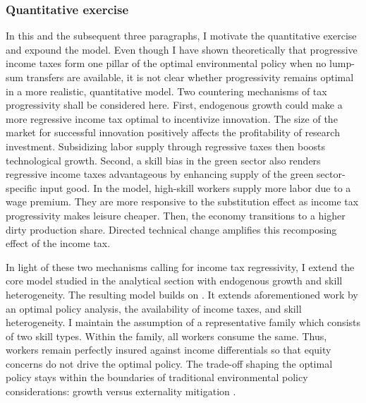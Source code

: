 \subsubsection*{Quantitative exercise}
In this and the subsequent three paragraphs, I motivate the quantitative exercise and expound the model.
Even though I have shown theoretically that progressive income taxes form one pillar of the optimal environmental policy when no lump-sum transfers are available, it is not clear whether progressivity remains optimal in a more realistic, quantitative model. 
Two countering mechanisms of tax progressivity shall be considered here.
First, endogenous growth could make a more regressive income tax optimal to incentivize innovation. The size of the market for successful innovation positively affects the profitability of research investment. Subsidizing labor supply through regressive taxes then boosts technological growth. Second, a skill bias in the green sector also renders regressive income taxes advantageous by enhancing supply of the green sector-specific input good. In the model, high-skill workers supply more labor due to a wage premium. They are more responsive to the substitution effect as income tax progressivity makes leisure cheaper. Then, the economy transitions to a higher dirty production share. Directed technical change amplifies this recomposing effect of the income tax. 

In light of these two mechanisms calling for income tax regressivity, I extend the core model studied in the analytical section with endogenous growth and skill heterogeneity. The resulting model builds on \cite{Fried2018ClimateAnalysis}. It extends aforementioned work by an optimal policy analysis, the availability of income taxes, and skill heterogeneity. 
I maintain the assumption of a representative family which consists of two skill types. Within the family, all workers consume the same. Thus, workers remain perfectly insured against income differentials so that equity concerns do not drive the optimal policy. The trade-off shaping the optimal policy stays within the boundaries of traditional environmental policy considerations: growth versus externality mitigation \citep{Stokey1998AreGrowth, Jones2016LifeGrowth, Acemoglu2012TheChange}.  

